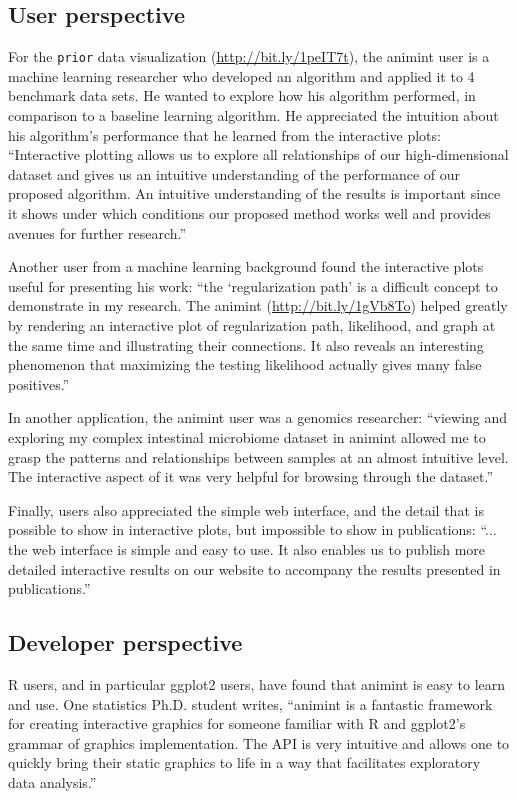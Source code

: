 \documentclass[journal]{vgtc}\usepackage[]{graphicx}\usepackage[]{color}
\begin{document}
\subsection{User perspective}

For the \texttt{prior} data visualization
(\url{http://bit.ly/1peIT7t}), the animint user is a machine learning
researcher who developed an algorithm and applied it to 4 benchmark
data sets. He wanted to explore how his algorithm performed, in
comparison to a baseline learning algorithm. He appreciated the
intuition about his algorithm's performance that he learned from the
interactive plots: ``Interactive plotting allows us to explore all
relationships of our high-dimensional dataset and gives us an
intuitive understanding of the performance of our proposed
algorithm. An intuitive understanding of the results is important
since it shows under which conditions our proposed method works well
and provides avenues for further research.''

Another user from a machine learning background found the interactive
plots useful for presenting his work: ``the `regularization path' is a
difficult concept to demonstrate in my research. The animint
(\url{http://bit.ly/1gVb8To}) helped greatly by rendering an
interactive plot of regularization path, likelihood, and graph at the
same time and illustrating their connections. It also reveals an
interesting phenomenon that maximizing the testing likelihood actually
gives many false positives.''

In another application, the animint user was a genomics researcher:
``viewing and exploring my complex intestinal microbiome dataset in
animint allowed me to grasp the patterns and relationships between
samples at an almost intuitive level. The interactive aspect of it was
very helpful for browsing through the dataset.''

Finally, users also appreciated the simple web interface, and the
detail that is possible to show in interactive plots, but impossible
to show in publications: ``...  the web interface is simple and easy
to use.  It also enables us to publish more detailed interactive
results on our website to accompany the results presented in
publications.''

\subsection{Developer perspective}

R users, and in particular ggplot2 users, have found that animint 
is easy to learn and use. One statistics Ph.D. student writes, 
``animint is a fantastic framework for creating
interactive graphics for someone familiar with R and ggplot2's grammar
of graphics implementation. The API is very intuitive and allows one
to quickly bring their static graphics to life in a way that
facilitates exploratory data analysis.''
\end{document}

